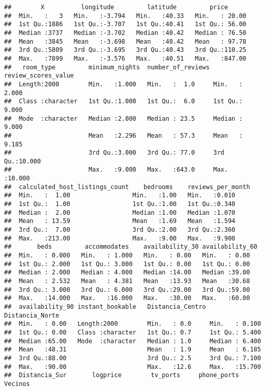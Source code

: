 \documentclass[
]{article}
\begin{document}
\begin{verbatim}
##        X          longitude         latitude         price       
##  Min.   :   3   Min.   :-3.794   Min.   :40.33   Min.   : 20.00  
##  1st Qu.:1886   1st Qu.:-3.707   1st Qu.:40.41   1st Qu.: 56.00  
##  Median :3737   Median :-3.702   Median :40.42   Median : 76.50  
##  Mean   :3845   Mean   :-3.698   Mean   :40.42   Mean   : 97.78  
##  3rd Qu.:5809   3rd Qu.:-3.695   3rd Qu.:40.43   3rd Qu.:110.25  
##  Max.   :7899   Max.   :-3.576   Max.   :40.51   Max.   :847.00  
##   room_type         minimum_nights  number_of_reviews review_scores_value
##  Length:2000        Min.   :1.000   Min.   :  1.0     Min.   : 2.000     
##  Class :character   1st Qu.:1.000   1st Qu.:  6.0     1st Qu.: 9.000     
##  Mode  :character   Median :2.000   Median : 23.5     Median : 9.000     
##                     Mean   :2.296   Mean   : 57.3     Mean   : 9.185     
##                     3rd Qu.:3.000   3rd Qu.: 77.0     3rd Qu.:10.000     
##                     Max.   :9.000   Max.   :643.0     Max.   :10.000     
##  calculated_host_listings_count    bedrooms    reviews_per_month
##  Min.   :  1.00                 Min.   :1.00   Min.   :0.010    
##  1st Qu.:  1.00                 1st Qu.:1.00   1st Qu.:0.340    
##  Median :  2.00                 Median :1.00   Median :1.070    
##  Mean   : 13.59                 Mean   :1.69   Mean   :1.594    
##  3rd Qu.:  7.00                 3rd Qu.:2.00   3rd Qu.:2.360    
##  Max.   :213.00                 Max.   :9.00   Max.   :9.900    
##       beds         accommodates    availability_30 availability_60
##  Min.   : 0.000   Min.   : 1.000   Min.   : 0.00   Min.   : 0.00  
##  1st Qu.: 2.000   1st Qu.: 3.000   1st Qu.: 0.00   1st Qu.: 0.00  
##  Median : 2.000   Median : 4.000   Median :14.00   Median :39.00  
##  Mean   : 2.532   Mean   : 4.381   Mean   :13.93   Mean   :30.68  
##  3rd Qu.: 3.000   3rd Qu.: 6.000   3rd Qu.:29.00   3rd Qu.:59.00  
##  Max.   :14.000   Max.   :16.000   Max.   :30.00   Max.   :60.00  
##  availability_90 instant_bookable   Distancia_Centro Distancia_Norte 
##  Min.   : 0.00   Length:2000        Min.   : 0.0     Min.   : 0.100  
##  1st Qu.: 0.00   Class :character   1st Qu.: 0.7     1st Qu.: 5.400  
##  Median :65.00   Mode  :character   Median : 1.0     Median : 6.400  
##  Mean   :48.31                      Mean   : 1.9     Mean   : 6.185  
##  3rd Qu.:88.00                      3rd Qu.: 2.5     3rd Qu.: 7.100  
##  Max.   :90.00                      Max.   :12.6     Max.   :15.700  
##  Distancia_Sur       logprice        tv_ports     phone_ports      Vecinos     

\end{verbatim}
\end{document}

